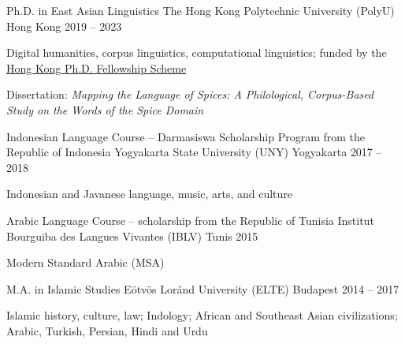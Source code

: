 
\begin{cventries}

  \cventry
    {Ph.D. in East Asian Linguistics} %
    {The Hong Kong Polytechnic University (PolyU)} %
    {Hong Kong} %
    {2019 -- 2023} %
    {
      \begin{cvitems} %
        \item {Digital humanities, corpus linguistics, computational linguistics; funded by the \href{https://cerg1.ugc.edu.hk/hkpfs/index.html}{Hong Kong Ph.D. Fellowship Scheme}}
        \item {Dissertation: \textit{Mapping the Language of Spices: A Philological, Corpus-Based Study on the Words of the Spice Domain} \href{https://partigabor.github.io/files/partigabor-phd-thesis-final-20230303.pdf}{\faPaperclip}}
      \end{cvitems}
    }

    \cventry
    {Indonesian Language Course -- Darmasiswa Scholarship Program from the Republic of Indonesia} %
    {Yogyakarta State University (UNY)} %
    {Yogyakarta} %
    {2017 -- 2018} %
    {
      \begin{cvitems} %
        \item {Indonesian and Javanese language, music, arts, and culture}
      \end{cvitems}
    }

  \cventry
    {Arabic Language Course -- scholarship from the Republic of Tunisia} %
    {Institut Bourguiba des Langues Vivantes (IBLV)} %
    {Tunis} %
    {2015} %
    {
      \begin{cvitems} %
        \item {Modern Standard Arabic (MSA)}
      \end{cvitems}
    }
    
\cventry
    {M.A. in Islamic Studies} %
    {Eötvös Loránd University (ELTE)} %
    {Budapest} %
    {2014 -- 2017} %
    {
      \begin{cvitems} %
        \item {Islamic history, culture, law; Indology; African and Southeast Asian civilizations; Arabic, Turkish, Persian, Hindi and Urdu}
      \end{cvitems}
    }


\end{cventries}
